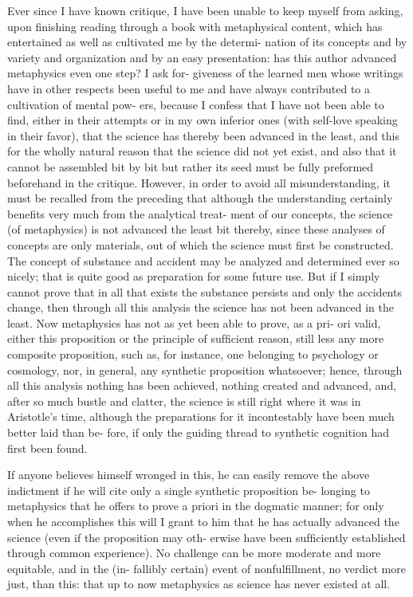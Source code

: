 Ever since I have known critique, I have been unable to keep myself
from asking, upon ﬁnishing reading through a book with metaphysical
content, which has entertained as well as cultivated me by the determi-
nation of its concepts and by variety and organization and by an easy
presentation: has this author advanced metaphysics even one step? I ask for-
giveness of the learned men whose writings have in other respects been
useful to me and have always contributed to a cultivation of mental pow-
ers, because I confess that I have not been able to ﬁnd, either in their
attempts or in my own inferior ones (with self-love speaking in their
favor), that the science has thereby been advanced in the least, and this
for the wholly natural reason that the science did not yet exist, and also
that it cannot be assembled bit by bit but rather its seed must be fully
preformed beforehand in the critique. However, in order to avoid all
misunderstanding, it must be recalled from the preceding that although
the understanding certainly beneﬁts very much from the analytical treat-
ment of our concepts, the science (of metaphysics) is not advanced the
least bit thereby, since these analyses of concepts are only materials, out
of which the science must ﬁrst be constructed. The concept of substance
and accident may be analyzed and determined ever so nicely; that is
quite good as preparation for some future use. But if I simply cannot
prove that in all that exists the substance persists and only the accidents
change, then through all this analysis the science has not been advanced
in the least. Now metaphysics has not as yet been able to prove, as a pri-
ori valid, either this proposition or the principle of sufﬁcient reason, still
less any more composite proposition, such as, for instance, one belonging
to psychology or cosmology, nor, in general, any synthetic proposition
whatsoever; hence, through all this analysis nothing has been achieved,
nothing created and advanced, and, after so much bustle and clatter,
the science is still right where it was in Aristotle’s time, although the
preparations for it incontestably have been much better laid than be-
fore, if only the guiding thread to synthetic cognition had ﬁrst been
found.

If anyone believes himself wronged in this, he can easily remove the
above indictment if he will cite only a single synthetic proposition be-
longing to metaphysics that he offers to prove a priori in the dogmatic
manner; for only when he accomplishes this will I grant to him that
he has actually advanced the science (even if the proposition may oth-
erwise have been sufﬁciently established through common experience).
No challenge can be more moderate and more equitable, and in the (in-
fallibly certain) event of nonfulﬁllment, no verdict more just, than this:
that up to now metaphysics as science has never existed at all.

